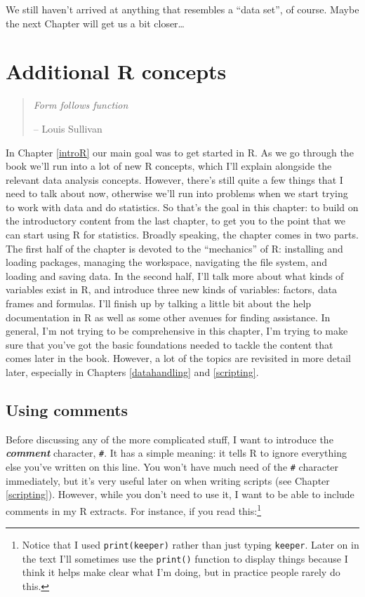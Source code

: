 \documentclass[
]{book}
\begin{document}
We still haven't arrived at anything that resembles a ``data set'', of course. Maybe the next Chapter will get us a bit closer\ldots{}

\hypertarget{mechanics}{%
\chapter{Additional R concepts}\label{mechanics}}

\begin{quote}
\emph{Form follows function}

-- Louis Sullivan
\end{quote}

In Chapter \ref{introR} our main goal was to get started in R. As we go through the book we'll run into a lot of new R concepts, which I'll explain alongside the relevant data analysis concepts. However, there's still quite a few things that I need to talk about now, otherwise we'll run into problems when we start trying to work with data and do statistics. So that's the goal in this chapter: to build on the introductory content from the last chapter, to get you to the point that we can start using R for statistics. Broadly speaking, the chapter comes in two parts. The first half of the chapter is devoted to the ``mechanics'' of R: installing and loading packages, managing the workspace, navigating the file system, and loading and saving data. In the second half, I'll talk more about what kinds of variables exist in R, and introduce three new kinds of variables: factors, data frames and formulas. I'll finish up by talking a little bit about the help documentation in R as well as some other avenues for finding assistance. In general, I'm not trying to be comprehensive in this chapter, I'm trying to make sure that you've got the basic foundations needed to tackle the content that comes later in the book. However, a lot of the topics are revisited in more detail later, especially in Chapters \ref{datahandling} and \ref{scripting}.

\hypertarget{comments}{%
\section{Using comments}\label{comments}}

Before discussing any of the more complicated stuff, I want to introduce the \textbf{\emph{comment}} character, \texttt{\#}. It has a simple meaning: it tells R to ignore everything else you've written on this line. You won't have much need of the \texttt{\#} character immediately, but it's very useful later on when writing scripts (see Chapter \ref{scripting}). However, while you don't need to use it, I want to be able to include comments in my R extracts. For instance, if you read this:\footnote{Notice that I used \texttt{print(keeper)} rather than just typing \texttt{keeper}. Later on in the text I'll sometimes use the \texttt{print()} function to display things because I think it helps make clear what I'm doing, but in practice people rarely do this.}
\end{document}
